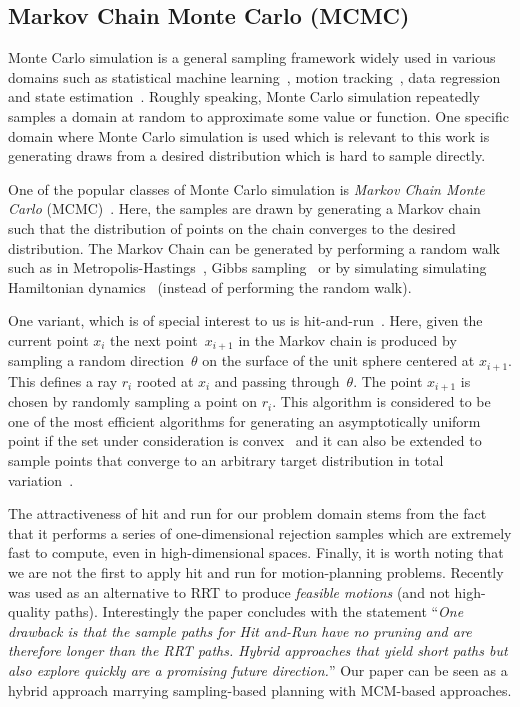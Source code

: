 \documentclass[letterpaper, 10 pt, conference]{ieeeconf}  %
\begin{document}
\subsection{Markov Chain Monte Carlo (MCMC)}
\label{subsec:mcmc}
Monte Carlo simulation is a general sampling framework widely used in various domains such as
statistical machine learning~\cite{M97},
motion tracking~\cite{KBD04}, 
data regression~\cite{TL11} and 
state estimation~\cite{ASC13}.
Roughly speaking, Monte Carlo simulation repeatedly samples a domain at random to approximate some value or function.
One specific domain where Monte Carlo simulation is used which is relevant to this work is generating draws from a desired distribution which is hard to sample directly.

One of the popular classes of Monte Carlo simulation is 
\emph{Markov Chain Monte Carlo} (MCMC)~\cite{ADDJ03}.
Here, the samples are drawn by generating a Markov chain such that the distribution of points on the chain converges to the desired distribution.
The Markov Chain can be generated by performing a random walk such as
in Metropolis-Hastings~\cite{CG95}, 
Gibbs sampling~\cite{CK94}
or by simulating simulating Hamiltonian dynamics~\cite{N94} (instead of performing the random walk).

One variant, which is of special interest to us is 
hit-and-run~\cite{S84,KSZ11}.
Here, given the current point $x_i$ the next point~$x_{i+1}$ in the Markov chain is produced by sampling a random direction~$\theta$ on the surface of the unit sphere centered at $x_{i+1}$. This defines a ray $r_i$ rooted at $x_i$ and passing through~$\theta$. The point $x_{i+1}$ is chosen by randomly sampling a point on $r_i$.
This algorithm is considered to be one of the most efficient algorithms for generating an asymptotically uniform point if the set under consideration is convex~\cite{L99, LV06}
and it can also be extended to sample points that converge to an arbitrary target distribution in total variation~\cite{BRS93, RS94}.

The attractiveness of hit and run for our problem domain stems from the fact that it performs a series of one-dimensional rejection samples which are extremely fast to compute, even in high-dimensional spaces. 
Finally, it is worth noting that we are not the first to apply hit and run for motion-planning problems.
Recently~\cite{YPVA17} was used as an alternative to RRT to produce \emph{feasible motions} (and not high-quality paths). 
Interestingly the paper concludes with the statement ``\emph{One drawback is that the sample paths for Hit and-Run have no pruning and are therefore longer than the RRT paths. Hybrid approaches that yield short paths but also explore quickly are a promising future direction.}''
Our paper can be seen as a hybrid approach marrying sampling-based planning with MCM-based approaches.
\end{document}
